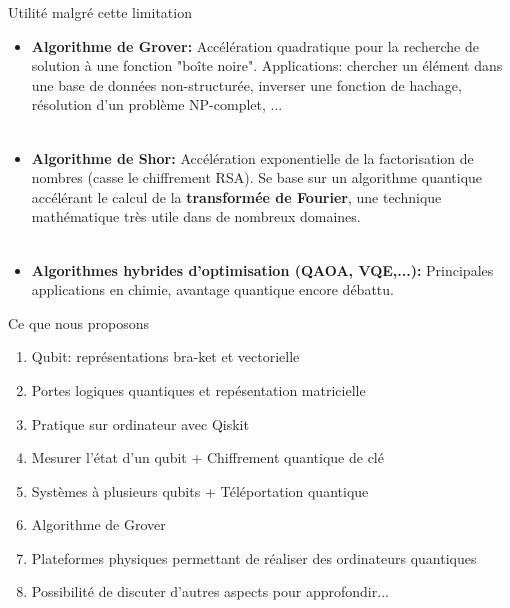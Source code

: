 \documentclass[aspectratio=169,12pt]{beamer}
\begin{document}
\begin{frame}{Utilité malgré cette limitation}
  \begin{itemize}
    \item {\bf Algorithme de Grover:} Accélération quadratique pour la recherche de solution à une fonction "boîte noire". Applications: chercher un élément dans une base de données non-structurée, inverser une fonction de hachage, résolution d'un problème NP-complet, ... \\~\\
    \item {\bf Algorithme de Shor:} Accélération exponentielle de la factorisation de nombres (casse le chiffrement RSA). Se base sur un algorithme quantique accélérant le calcul de la {\bf transformée de Fourier}, une technique mathématique très utile dans de nombreux domaines. \\~\\
    \item {\bf Algorithmes hybrides d'optimisation (QAOA, VQE,...):} Principales applications en chimie, avantage quantique encore débattu.
  \end{itemize}
\end{frame}

\begin{frame}{Ce que nous proposons}
  
  \begin{enumerate}
    \setlength{\itemsep}{0.8em}
    \item Qubit: représentations bra-ket et vectorielle
    \item Portes logiques quantiques et repésentation matricielle
    \item Pratique sur ordinateur avec Qiskit
    \item Mesurer l'état d'un qubit + Chiffrement quantique de clé
    \item Systèmes à plusieurs qubits + Téléportation quantique
    \item Algorithme de Grover
    \item Plateformes physiques permettant de réaliser des ordinateurs quantiques
    \item Possibilité de discuter d'autres aspects pour approfondir...
  \end{enumerate}
\end{frame}
\end{document}
